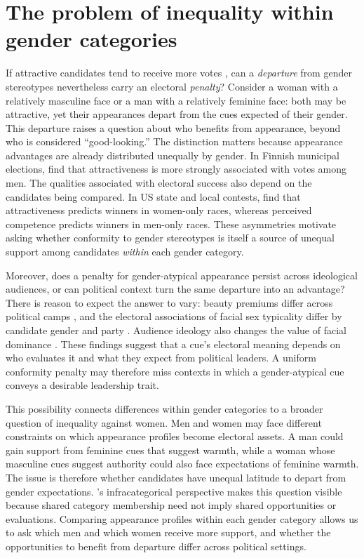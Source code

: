 \documentclass[11pt,a4paper]{article}\usepackage[]{graphicx}\usepackage[]{xcolor}
\begin{document}
\section{The problem of inequality within gender categories}
\label{sec:introduction}

If attractive candidates tend to receive more votes \parencite{BerggrenEtAl2010}, can a \emph{departure} from gender stereotypes nevertheless carry an electoral \emph{penalty}? Consider a woman with a relatively masculine face or a man with a relatively feminine face: both may be attractive, yet their appearances depart from the cues expected of their gender. This departure raises a question about who benefits from appearance, beyond who is considered ``good-looking.'' The distinction matters because appearance advantages are already distributed unequally by gender. In Finnish municipal elections, \textcite{Bahamonde2024} find that attractiveness is more strongly associated with votes among men. The qualities associated with electoral success also depend on the candidates being compared. In US state and local contests, \textcite[441--443]{DitontoMattes2018} find that attractiveness predicts winners in women-only races, whereas perceived competence predicts winners in men-only races. These asymmetries motivate asking whether conformity to gender stereotypes is itself a source of unequal support among candidates \emph{within} each gender category.

Moreover, does a penalty for gender-atypical appearance persist across ideological audiences, or can political context turn the same departure into an advantage? There is reason to expect the answer to vary: beauty premiums differ across political camps \parencite{BerggrenEtAl2017}, and the electoral associations of facial sex typicality differ by candidate gender and party \parencite{Carpinella2016}. Audience ideology also changes the value of facial dominance \parencite{LaustsenPetersen2016}. These findings suggest that a cue's electoral meaning depends on who evaluates it and what they expect from political leaders. A uniform conformity penalty may therefore miss contexts in which a gender-atypical cue conveys a desirable leadership trait.

This possibility connects differences within gender categories to a broader question of inequality against women. Men and women may face different constraints on which appearance profiles become electoral assets. A man could gain support from feminine cues that suggest warmth, while a woman whose masculine cues suggest authority could also face expectations of feminine warmth. The issue is therefore whether candidates have unequal latitude to depart from gender expectations. \textcite{Monk2022}'s infracategorical perspective makes this question visible because shared category membership need not imply shared opportunities or evaluations. Comparing appearance profiles within each gender category allows us to ask which men and which women receive more support, and whether the opportunities to benefit from departure differ across political settings.
\end{document}
